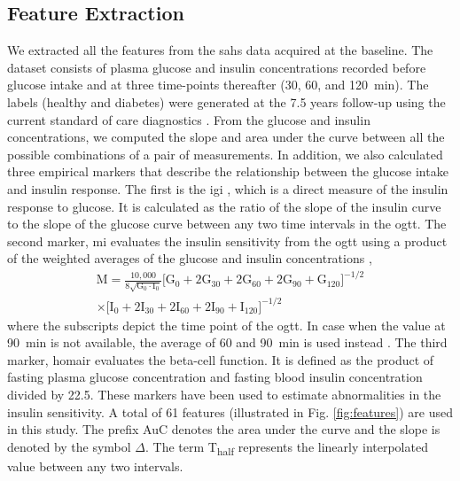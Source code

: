\documentclass[journal,comsoc]{IEEEtran}
\renewcommand{\^}{\hat}  %
\begin{document}
\subsection{Feature Extraction}
%
We extracted all the features from the \ac{sahs} data acquired at the baseline. The dataset consists of plasma glucose and insulin concentrations recorded before glucose intake and at three time-points thereafter (\num{30}, \num{60}, and \SI{120}{\minute}). The labels (healthy and diabetes) were generated at the \num{7.5} years follow-up using the current standard of care diagnostics \cite{burke_rapid_1999}. From the glucose and insulin concentrations, we computed the slope and area under the curve between all the possible combinations of a pair of measurements. In addition, we also calculated three empirical markers that describe the relationship between the glucose intake and insulin response. The first is the \ac{igi} \cite{seino1975insulinogenic}, which is a direct measure of the insulin response to glucose. It is calculated as the ratio of the slope of the insulin curve to the slope of the glucose curve between any two time intervals in the \ac{ogtt}. The second marker, \ac{mi} evaluates the insulin sensitivity from the \ac{ogtt} using a product of the weighted averages of the glucose and insulin concentrations \cite{Matsuda1462},
%
\begin{equation}
  \begin{split}
    \mathrm{M} = \frac{10,000}{8\sqrt{\mathrm{G}_0 \cdot \mathrm{I}_0}}
     \big[{\mathrm{G}_0+2\mathrm{G}_{30}+2\mathrm{G}_{60}+2\mathrm{G}_{90}+ \mathrm{G}_{120}}\big]^{-1/2}\\
      \times \big[{\mathrm{I}_0+2\mathrm{I}_{30}+2\mathrm{I}_{60}+2\mathrm{I}_{90}+\mathrm{I}_{120}} \big]^{-1/2}
  \end{split}
  \label{eq:mat_idx}
\end{equation}
%
%
where the subscripts depict the time point of the \ac{ogtt}. In case when the value at \SI{90}{\minute} is not available, the average of \num{60} and \SI{90}{\minute} is used instead \cite{Matsuda1462}. The third marker, \ac{homair} \cite{matthews1985homeostasis} evaluates the beta-cell function. It is defined as the product of fasting plasma glucose concentration and fasting blood insulin concentration divided by \num{22.5}. These markers have been used to estimate abnormalities in the insulin sensitivity. A total of \num{61} features (illustrated in Fig. \ref{fig:features}) are used in this study. The prefix AuC denotes the area under the curve and the slope is denoted by the symbol $\Delta$. The term T\textsubscript{half} represents the linearly interpolated value between any two intervals.
\end{document}
